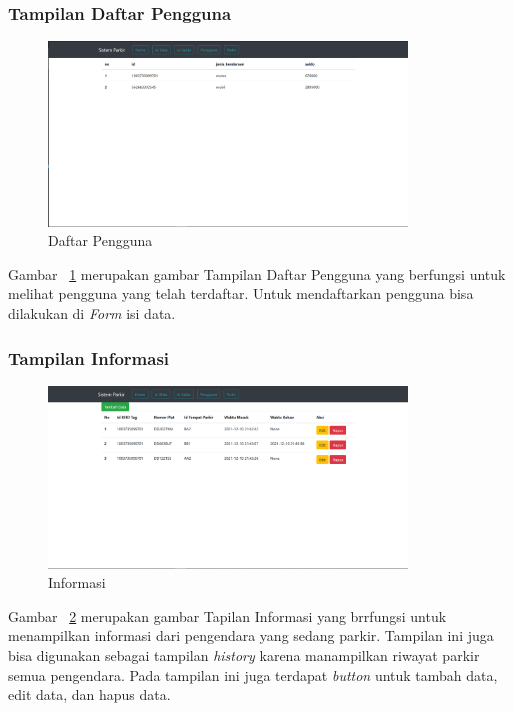 \subsubsection{Tampilan Daftar Pengguna}
\begin{figure} [H]
    \includegraphics[width=0.85\textwidth, center]{images/web 4 pengguna.png}
    \caption{Daftar Pengguna}
    \label{fig:web4pengguna}
\end{figure}

Gambar ~\ref{fig:web4pengguna} merupakan gambar Tampilan Daftar Pengguna yang berfungsi untuk melihat pengguna yang telah terdaftar. Untuk mendaftarkan pengguna bisa dilakukan di \textit{Form} isi data.

\subsubsection{Tampilan Informasi}
\begin{figure} [H]
    \includegraphics[width=0.85\textwidth, center]{images/web 5 informasi.png}
    \caption{Informasi}
    \label{fig:web5informasi}
\end{figure}

Gambar ~\ref{fig:web5informasi} merupakan gambar Tapilan Informasi yang brrfungsi untuk menampilkan informasi dari pengendara yang sedang parkir. Tampilan ini juga bisa digunakan sebagai tampilan \textit{history} karena manampilkan riwayat parkir semua pengendara. Pada tampilan ini juga terdapat \textit{button} untuk tambah data, edit data, dan hapus data.

